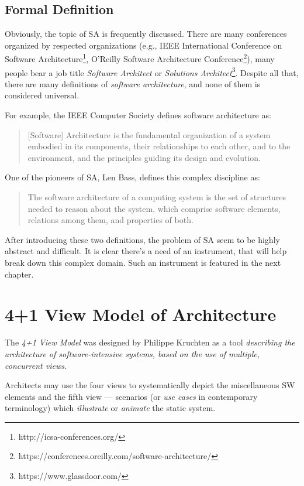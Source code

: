 \documentclass[thesis=M,english,hidelinks]{FITthesis}[2012/10/20]
\begin{document}
\subsection{Formal Definition}
Obviously, the topic of \acrfull{SA} is frequently discussed. There are many conferences organized by respected organizations (e.g., IEEE International Conference on Software Architecture\footnote{http://icsa-conferences.org/}, O'Reilly Software Architecture Conference\footnote{https://conferences.oreilly.com/software-architecture/}), many people bear a job title \textit{Software Architect} or \textit{Solutions Architect}\footnote{https://www.glassdoor.com/}. Despite all that, there are many definitions of \textit{software architecture}, and none of them is considered universal.

For example, the IEEE Computer Society defines software architecture as:
\begin{quote}
    [Software] Architecture is the fundamental organization of a system embodied in its components, their relationships to each other, and to the environment, and the principles guiding its design and evolution.~\cite{std-ieee-arch}
\end{quote}

One of the pioneers of \acrlong{SA}, Len Bass, defines this complex discipline as:
\begin{quote}
    The software architecture of a computing system is the set of structures needed to reason about the system, which comprise software elements, relations among them, and properties of both.~\cite{documenting-sw-arch}
\end{quote}

After introducing these two definitions, the problem of \acrshort{SA} seem to be highly abstract and difficult. It is clear there's a need of an instrument, that will help break down this complex domain. Such an instrument is featured in the next chapter.

% 
% 
\section{4+1 View Model of Architecture}
The \textit{4+1 View Model} was designed by Philippe Kruchten as a tool \textit{describing the architecture of software-intensive systems, based on the use of multiple, concurrent views}.~\cite{arch-41-views}

Architects may use the four views to systematically depict the miscellaneous \acrshort{SW} elements and the fifth view --- scenarios (or \textit{use cases} in contemporary terminology) which \textit{illustrate} or \textit{animate} the static system.
\end{document}
